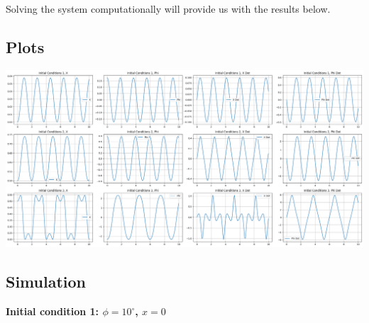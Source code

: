 \documentclass{article}
\begin{document}
Solving the system computationally will provide us with the results below.


\subsection{Plots}

\begin{center}
  \includegraphics[scale=0.25]{plots/task2_plots.png}
\end{center}

\newpage

\subsection{Simulation}


\textbf{Initial condition 1: $\phi = 10^\circ$, $x = 0$}
\end{document}
